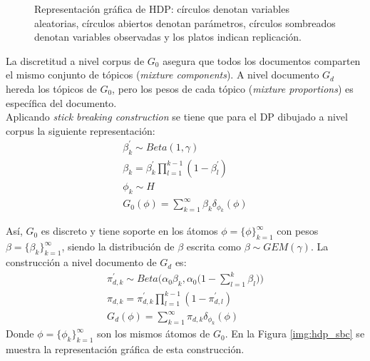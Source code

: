 \documentclass[letterpaper,12pt,oneside]{book} %
\begin{document}
\begin{figure}
  \centering
\caption{Representación gráfica de HDP: círculos denotan variables aleatorias, círculos abiertos denotan parámetros, círculos sombreados denotan variables observadas y los platos indican replicación.}
\label{img:hdp}
\end{figure}

La discretitud a nivel corpus de $G_{0}$ asegura que todos los documentos comparten el mismo conjunto de tópicos (\textit{mixture components}). A nivel documento $G_{d}$ hereda los tópicos de $G_{0}$, pero los pesos de cada tópico (\textit{mixture proportions}) es específica del documento.\\

Aplicando \textit{stick breaking construction} se tiene que para el DP dibujado a nivel corpus la siguiente representación:
\begin{equation}
\begin{aligned}
    \beta_{k}^{'} \sim Beta(1, \gamma) \\
    \beta_{k} = \beta_{k}^{'}\prod_{l=1}^{k-1}(1-\beta_{l}^{'})\\
    \phi_{k} \sim H  \\
    G_{0}(\phi)=\sum_{k=1}^{\infty}\beta_{k}\delta_{\phi_{k}}(\phi)
\end{aligned}
\end{equation}

Así, $G_{0}$ es discreto y tiene soporte en los átomos $\phi = \{\phi\}_{k=1}^{\infty}$ con pesos $\beta=\{\beta_{k}\}_{k=1}^{\infty}$, siendo la distribución de $\beta$ escrita como $\beta \sim GEM(\gamma)$. La construcción a nivel documento de $G_{d}$ es:
\begin{equation}
\begin{aligned}
    \pi_{d,k}^{'}\sim Beta\big(\alpha_{0}\beta_{k}, \alpha_{0}\big(1-\sum_{l=1}^{k}\beta_{l}\big)\big)\\
    \pi_{d,k} = \pi_{d,k}^{'}\prod_{l=1}^{k-1}(1-\pi_{d,l}^{'})\\
    G_{d}(\phi)=\sum_{k=1}^{\infty}\pi_{d,k}\delta_{\phi_{k}}(\phi)
\end{aligned}
\end{equation}
Donde $\phi = \{\phi_{k}\}_{k=1}^{\infty}$ son los mismos átomos de $G_{0}$. En la Figura \ref{img:hdp_sbc} se muestra la representación gráfica de esta construcción.
\end{document}
